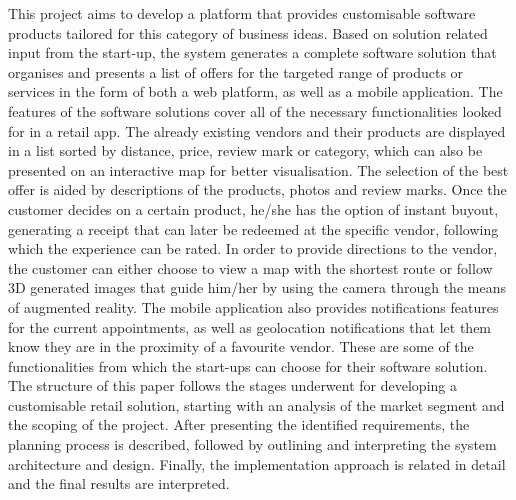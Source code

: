 This project aims to develop a platform that provides customisable software products tailored for this category of business ideas. Based on solution related input from the start-up, the system generates a complete software solution that organises and presents a list of offers for the targeted range of products or services in the form of both a web platform, as well as a mobile application. The features of the software solutions cover all of the necessary functionalities looked for in a retail app. The already existing vendors and their products are displayed in a list sorted by distance, price, review mark or category, which can also be presented on an interactive map for better visualisation. The selection of the best offer is aided by descriptions of the products, photos and review marks. Once the customer decides on a certain product, he/she has the option of instant buyout, generating a receipt that can later be redeemed at the specific vendor, following which the experience can be rated. In order to provide directions to the vendor, the customer can either choose to view a map with the shortest route or follow 3D generated images that guide him/her by using the camera through the means of augmented reality. The mobile application also provides notifications features for the current appointments, as well as geolocation notifications that let them know they are in the proximity of a favourite vendor. These are some of the functionalities from which the start-ups can choose for their software solution.\\

The structure of this paper follows the stages underwent for developing a customisable retail solution, starting with an analysis of the market segment and the scoping of the project. After presenting the identified requirements, the planning process is described, followed by outlining and interpreting the system architecture and design. Finally, the implementation approach is related in detail and the final results are interpreted.
